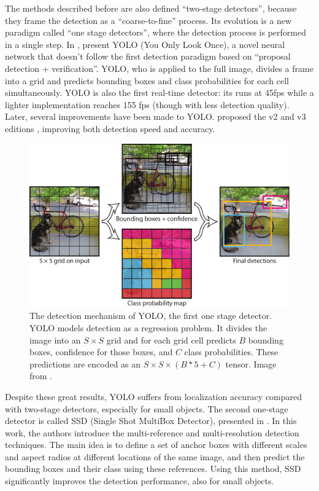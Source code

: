  The methods described before are also defined ``two-stage detectors'', because they frame the detection as a ``coarse-to-fine'' process. Its evolution is a new paradigm called ``one stage detectors'', where the detection process is performed in a single step.  In \cite{yolo}, \citeauthor{yolo} present YOLO (You Only Look Once), a novel neural network that doesn't follow the first detection paradigm based on ``proposal detection + verification''. YOLO, who is applied to the full image, divides a frame into a grid and predicts bounding boxes and class probabilities for each cell simultaneously. YOLO is also the first real-time detector: its runs at 45fps while a lighter implementation reaches 155 fps (though with less detection quality).  Later, several improvements have been made to YOLO. \citeauthor{yolov2}  proposed the v2 and v3 editions \cite{yolov2, yolov3}, improving both detection speed and accuracy.
 
  \begin{figure}[h!]
 	\centering
 	\includegraphics[width=0.8\linewidth]{images/yolo.png}
 	\caption{The detection mechanism of YOLO, the first one stage detector. YOLO models detection as a regression problem. It divides the image into an $S \times S$ grid and for each grid cell predicts $B$ bounding boxes, confidence for those boxes,
 	and $C$ class probabilities. These predictions are encoded as an
 	$S \times S \times (B * 5 + C)$ tensor. Image from \cite{yolo}.}
 \end{figure}
 
 Despite these great results, YOLO suffers from localization accuracy compared with two-stage detectors, especially for small objects. The second one-stage detector is called SSD (Single Shot MultiBox Detector), presented in \cite{ssd}. In this work, the authors introduce the multi-reference and multi-resolution detection techniques. The main idea is to define a set of anchor boxes with different scales and aspect radios at different locations of the same image, and then predict the bounding boxes and their class using these references. Using this method, SSD significantly improves the detection performance, also for small objects. 
 
